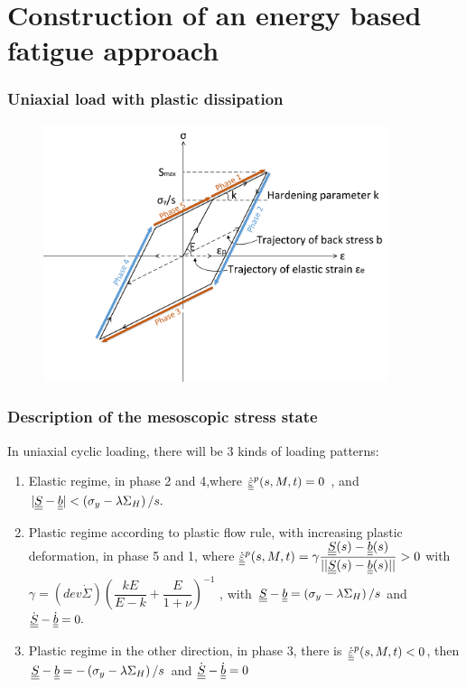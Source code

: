 \documentclass[xcolor=table]{Bredelebeamer}
\begin{document}
\section{Construction of an energy based fatigue approach}
\begin{frame}
	\frametitle{Uniaxial load with plastic dissipation}	
	\begin{figure}[h!]
		\centering
		\includegraphics[width=0.9\textwidth]{figures//backstress.png} 
		\label{backstress}
	\end{figure}
\end{frame}	
\begin{frame}
	\frametitle{Description of the mesoscopic stress state}	
In uniaxial cyclic loading, there will be 3 kinds of loading patterns:
\begin{enumerate}
	
	\item	Elastic regime, in phase 2 and 4,where $\dot{\uline{\uline{\varepsilon}}}^p(s,M,t)=0$ ,  and $|\uline{\uline{S}}-\uline{\uline{b}}|<\left( \sigma_y-\lambda \Sigma_H\right)/s. $ 
	\vspace{6pt}
	
	\item Plastic regime according to plastic flow rule, with increasing plastic deformation, in phase 5 and 1, where	$\dot{\uline{\uline{\varepsilon}}}^p(s,M,t)=\gamma\dfrac{\uline{\uline{S}}(s)-\uline{\uline{b}}(s)}{||\uline{\uline{S}}(s)-\uline{\uline{b}}(s)||}> 0$ with  $\gamma=\left( dev\dot{\Sigma}\right)\left(\dfrac{kE}{E-k}+\dfrac{E}{1+\nu} \right) ^{-1}$ ,  with $\uline{\uline{S}}-\uline{\uline{b}}=\left( \sigma_y-\lambda \Sigma_H\right)/s$ and $\dot{\uline{\uline{S}}}-\dot{\uline{\uline{b}}}=0.$ 
	\vspace{6pt}
	
	\item Plastic regime in the other direction, in phase 3, there is	$\dot{\uline{\uline{\varepsilon}}}^p(s,M,t)<0$,  then $\uline{\uline{S}}-\uline{\uline{b}}=-\left( \sigma_y-\lambda \Sigma_H\right)/s$ and $\dot{\uline{\uline{S}}}-\dot{\uline{\uline{b}}}=0$ 
	
\end{enumerate}	

\end{frame}	
\end{document}
